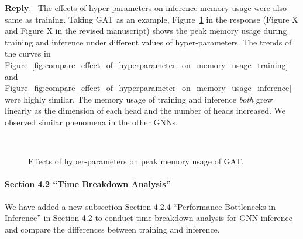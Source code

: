 \documentclass[12pt]{article}
\newenvironment{reply}
   {\medskip \noindent \textbf{Reply}:\  }
   {\medskip}
\begin{document}
\begin{reply}
    The effects of hyper-parameters on inference memory usage were also same as training.
    Taking GAT as an example, Figure~\ref{fig:compare_effect_of_hyperparameter_on_memory_usage} in the response (Figure X and Figure X in the revised manuscript) shows the peak memory usage during training and inference under different values of hyper-parameters.
    The trends of the curves in Figure~\ref{fig:compare_effect_of_hyperparameter_on_memory_usage_training} and Figure~\ref{fig:compare_effect_of_hyperparameter_on_memory_usage_inference} were highly similar.
    The memory usage of training and inference \emph{both} grew linearly as the dimension of each head and the number of heads increased.
    We observed similar phenomena in the other GNNs.
    \begin{figure}[H]
            \centering
            \\
            \caption{Effects of hyper-parameters on peak memory usage of GAT.}
            \label{fig:compare_effect_of_hyperparameter_on_memory_usage}
    \end{figure}
        
    \paragraph{Section 4.2 ``Time Breakdown Analysis''}    
    We have added a new subsection Section 4.2.4 ``Performance Bottlenecks in Inference'' in Section 4.2 to conduct time breakdown analysis for GNN inference and compare the differences between training and inference.


\end{reply}
\end{document}

